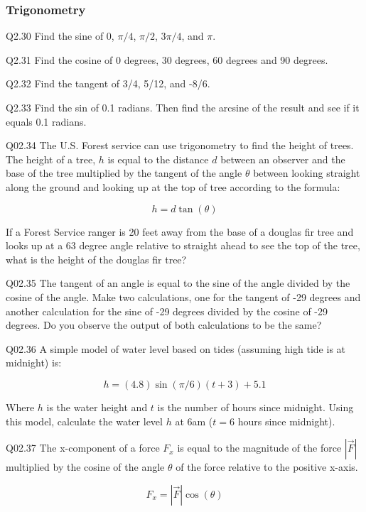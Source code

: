 \documentclass{book}
\newenvironment{problems}{}{}  %
\begin{document}
    
        \begin{problems}
        \hypertarget{trigonometry}{%
\subsubsection{Trigonometry}\label{trigonometry}}

Q2.30 Find the sine of \(0\), \(\pi/4\), \(\pi/2\), \(3\pi/4\), and
\(\pi\).

Q2.31 Find the cosine of 0 degrees, 30 degrees, 60 degrees and 90
degrees.

Q2.32 Find the tangent of 3/4, 5/12, and -8/6.

Q2.33 Find the sin of 0.1 radians. Then find the arcsine of the result
and see if it equals 0.1 radians.

Q02.34 The U.S. Forest service can use trigonometry to find the height
of trees. The height of a tree, \(h\) is equal to the distance \(d\)
between an observer and the base of the tree multiplied by the tangent
of the angle \(\theta\) between looking straight along the ground and
looking up at the top of tree according to the formula:

\[ h = d\tan(\theta) \]

If a Forest Service ranger is 20 feet away from the base of a douglas
fir tree and looks up at a 63 degree angle relative to straight ahead to
see the top of the tree, what is the height of the douglas fir tree?

Q02.35 The tangent of an angle is equal to the sine of the angle divided
by the cosine of the angle. Make two calculations, one for the tangent
of -29 degrees and another calculation for the sine of -29 degrees
divided by the cosine of -29 degrees. Do you observe the output of both
calculations to be the same?

Q02.36 A simple model of water level based on tides (assuming high tide
is at midnight) is:

\[ h = (4.8)\sin(\pi/6)(t+3)+5.1 \]

Where \(h\) is the water height and \(t\) is the number of hours since
midnight. Using this model, calculate the water level \(h\) at 6am
(\(t=6\) hours since midnight).

Q02.37 The x-component of a force \(F_x\) is equal to the magnitude of
the force \(|\vec{F}|\) multiplied by the cosine of the angle \(\theta\)
of the force relative to the positive x-axis.

\[ F_x = |\vec{F}|\cos(\theta) \]


\end{problems}
\end{document}

